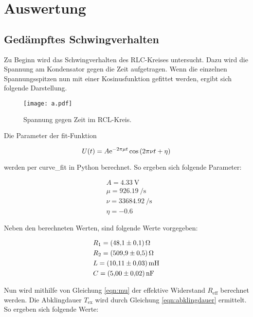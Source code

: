 %

%
\section{Auswertung}
\label{sec:Auswertung}

\subsection{Gedämpftes Schwingverhalten}

\noindent Zu Beginn wird das Schwingverhalten des RLC-Kreises untersucht. Dazu wird die Spannung am Kondensator gegen die Zeit aufgetragen. 
Wenn die einzelnen Spannungsspitzen nun mit einer Kosinusfunktion gefittet werden, ergibt sich folgende Darstellung.

\begin{figure}
    \texttt{[image: a.pdf]}
    \caption{Spannung gegen Zeit im RCL-Kreis.}
\end{figure}

\noindent Die Parameter der fit-Funktion

\begin{equation}
    U(t)= A \text e ^{-2\pi\mu t} \cos{ \left(2 \pi \nu t + \eta \right)}
\end{equation}

\noindent werden per curve\_fit in Python berechnet.
So ergeben sich folgende Parameter:

\begin{align}
    & A     = \qty{4.33}{\volt}       \\
    &\mu    = \qty{926.19}{\per \second}   \\
    &\nu    = \qty{33684.92}{\per \second} \\
    &\eta   = \qty{-0.6}{}
\end{align}

\noindent Neben den berechneten Werten, sind folgende Werte vorgegeben:

\begin{align}
    &R_1 =  \qty{48.1 \pm 0.1}{\ohm}    \\
    &R_2 =  \qty{509.9 \pm 0.5}{\ohm}   \\
    &L  =   \qty{10.11 \pm 0.03}{\milli \henry}\\
    &C  =   \qty{5 \pm 0.02}{\nano \farad}
\end{align}

\noindent Nun wird mithilfe von Gleichung \eqref{eqn:mu} der effektive Widerstand $R_{\text{eff}}$ berechnet werden. Die Abklingdauer $T_{\text{ex}}$ wird 
durch Gleichung \eqref{eqn:abklingdauer} ermittelt. So ergeben sich folgende Werte:

